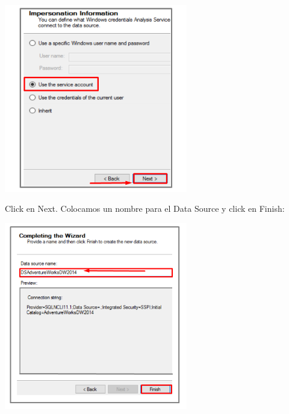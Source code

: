 	\begin{center}
	\includegraphics[width=8cm]{images/task1/img7}
    \end{center}	
Click en Next.
Colocamos un nombre para el Data Source y click en Finish:    
	\begin{center}
	\includegraphics[width=8cm]{images/task1/img8}
    \end{center}	
   